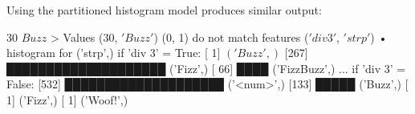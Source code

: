 Using the partitioned histogram model produces similar output:

\begin{lstnobreak}[gobble=2]
   $30$ $Buzz$
   > Values ($30$, $'Buzz'$) (0, 1) do not match
     features ($'div 3'$, $'strp'$)
     • histogram for ('strp',) if 'div 3' = True:
       [  1] $('Buzz',)$
       [267] ████████████████████ ('Fizz',)
       [ 66] ████ ('FizzBuzz',)
     ... if 'div 3' = False:
       [532] ████████████████████ ('<num>',)
       [133] █████ ('Buzz',)
       [  1] ('Fizz',)
       [  1] ('Woof!',)
\end{lstnobreak}

